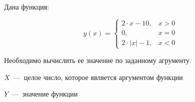 Дана функция:

\begin{equation*}
	y(x) = 
	\begin{cases}
		2 \cdot x - 10, & x > 0 \\
		0, & x = 0 \\
		2 \cdot \left| x \right| - 1, & x < 0
	\end{cases}	
\end{equation*}

Необходимо вычислить ее значение по заданному агрументу.

\InputFile

$X$~---~целое число, которое является аргументом функции

\OutputFile

$Y$~---~значение функции

\SAMPLES